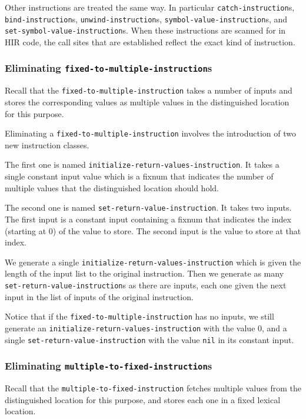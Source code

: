 Other instructions are treated the same way.  In particular
\texttt{catch-instruction}s, \texttt{bind-instruction}s,
\texttt{unwind-instruction}s, \texttt{symbol-value-instruction}s, and
\texttt{set-symbol-value-instruction}s.  When these instructions are
scanned for in HIR code, the call sites that are established reflect
the exact kind of instruction.

\subsubsection{Eliminating \texttt{fixed-to-multiple-instruction}s}

Recall that the \texttt{fixed-to-multiple-instruction} takes a
number of inputs and stores the corresponding values as multiple
values in the distinguished location for this purpose.

Eliminating a \texttt{fixed-to-multiple-instruction} involves the
introduction of two new instruction classes.

The first one is named \texttt{initialize-return-values-instruction}.
It takes a single constant input value which is a fixnum that
indicates the number of multiple values that the distinguished
location should hold.

The second one is named \texttt{set-return-value-instruction}.  It
takes two inputs.  The first input is a constant input containing a
fixnum that indicates the index (starting at 0) of the value to
store.  The second input is the value to store at that index.

We generate a single \texttt{initialize-return-values-instruction}
which is given the length of the input list to the original
instruction.  Then we generate as many
\texttt{set-return-value-instruction}s as there are inputs, each one
given the next input in the list of inputs of the original
instruction.

Notice that if the \texttt{fixed-to-multiple-instruction} has no
inputs, we still generate an
\texttt{initialize-return-values-instruction} with the value 0, and a
single \texttt{set-return-value-instruction} with the value
\texttt{nil} in its constant input.

\subsubsection{Eliminating \texttt{multiple-to-fixed-instruction}s}

Recall that the \texttt{multiple-to-fixed-instruction} fetches
multiple values from the distinguished location for this purpose, and
stores each one in a fixed lexical location.

